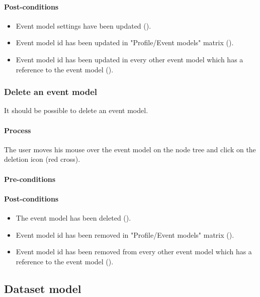 \documentclass[11pt,a4paper,oneside]{article}
\begin{document}
\paragraph{Post-conditions}
\begin{itemize}
	\item Event model settings have been updated ().
	\item Event model id has been updated in "Profile/Event models" matrix ().
	\item Event model id has been updated in every other event model which has a reference to the event model ().
\end{itemize}

\subsubsection{Delete an event model}
It should be possible to delete an event model.

\paragraph{Process}
The user moves his mouse over the event model on the node tree and click on the deletion icon (red cross).

\paragraph{Pre-conditions}

\paragraph{Post-conditions}
\begin{itemize}
	\item The event model has been deleted ().
	\item Event model id has been removed in "Profile/Event models" matrix ().
	\item Event model id has been removed from every other event model which has a reference to the event model ().
\end{itemize}

\subsection{Dataset model}
\end{document}
